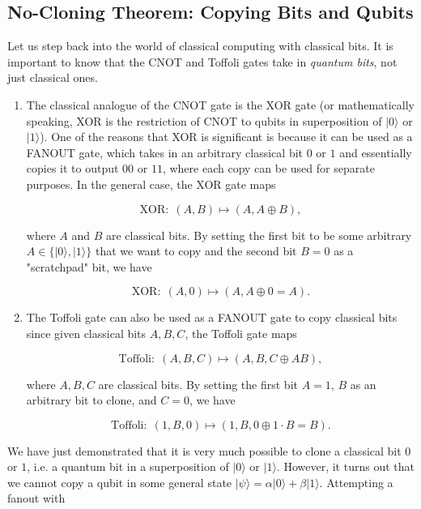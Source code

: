 \documentclass{article}
\theoremstyle{definition}
\begin{document}
  \subsection{No-Cloning Theorem: Copying Bits and Qubits}

    Let us step back into the world of classical computing with classical bits. It is important to know that the CNOT and Toffoli gates take in \textit{quantum bits}, not just classical ones.

    \begin{enumerate}
      \item The classical analogue of the CNOT gate is the XOR gate (or mathematically speaking, XOR is the restriction of CNOT to qubits in superposition of $|0\rangle$ or $|1\rangle$). One of the reasons that XOR is significant is because it can be used as a FANOUT gate, which takes in an arbitrary classical bit $0$ or $1$ and essentially copies it to output $00$ or $11$, where each copy can be used for separate purposes. In the general case, the XOR gate maps

        \[\text{XOR}: \; (A, B) \mapsto (A, A \oplus B),\]

      where $A$ and $B$ are classical bits. By setting the first bit to be some arbitrary $A \in \{|0\rangle, |1\rangle\}$ that we want to copy and the second bit $B = 0$ as a "scratchpad" bit, we have 

        \[\text{XOR}: \; (A, 0) \mapsto (A, A \oplus 0 = A).\]

      \item The Toffoli gate can also be used as a FANOUT gate to copy classical bits since given classical bits $A, B, C$, the Toffoli gate maps 

        \[\text{Toffoli}: \; (A, B, C) \mapsto (A, B, C \oplus A B),\]

      where $A, B, C$ are classical bits. By setting the first bit $A = 1$, $B$ as an arbitrary bit to clone, and $C=0$, we have 

        \[\text{Toffoli}: \; (1, B, 0) \mapsto (1, B, 0 \oplus 1\cdot B = B).\]
    \end{enumerate}

    We have just demonstrated that it is very much possible to clone a classical bit $0$ or $1$, i.e. a quantum bit in a superposition of $|0\rangle$ or $|1\rangle$. However, it turns out that we cannot copy a qubit in some general state $|\psi\rangle = \alpha |0\rangle + \beta |1\rangle$. Attempting a fanout with
\end{document}
